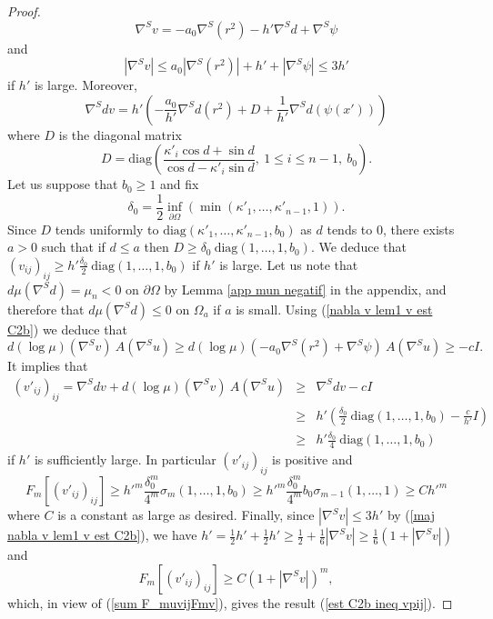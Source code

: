 \documentclass[10pt,reqno,oneside]{amsart}
\theoremstyle{definition}
\theoremstyle{remark}
\begin{document}
\begin{proof}
\begin{equation}\label{nabla v lem1 v est C2b}
\nabla^S v=-a_0\nabla^S(r^2)-h'\nabla^S d+\nabla^S\psi
\end{equation}
and 
\begin{equation}\label{maj nabla v lem1 v est C2b}
|\nabla^S v|\leq a_0|\nabla^S(r^2)|+h'+|\nabla^S\psi|\leq 3h'
\end{equation} 
if $h'$ is large. Moreover,
$$\nabla^S dv=h'\left(-\frac{a_0}{h'}\nabla^S d (r^2)+D+\frac{1}{h'}\nabla^S d(\psi(x'))\right)$$
where $D$ is the diagonal matrix
$$D=\mbox{diag}\left(\frac{\kappa'_i\cos d+\sin d}{\cos d-\kappa'_i\sin d},\ 1\leq i\leq n-1,\ b_0\right).$$
Let us suppose that $b_0\geq 1$ and fix
$$\delta_0=\frac{1}{2}\inf_{\partial\Omega}\left(\min(\kappa'_1,\ldots,\kappa'_{n-1},1)\right).$$
Since $D$ tends uniformly to $\mbox{diag}(\kappa'_1,\ldots,\kappa'_{n-1},b_0)$ as $d$ tends to 0, there exists $a>0$ such that if $d\leq a$ then $D\geq\delta_0\ \mbox{diag}(1,\ldots,1,b_0).$ We deduce that $(v_{ij})_{ij}\geq h'\frac{\delta_0}{2}\ \mbox{diag}(1,\ldots,1,b_0)$ if $h'$ is large. Let us note that $d\mu(\nabla^Sd)=\mu_n<0$ on $\partial\Omega$ by Lemma \ref{app mun negatif} in the appendix, and therefore that $d\mu(\nabla^Sd)\leq 0$ on $\Omega_a$ if $a$ is small. Using (\ref{nabla v lem1 v est C2b}) we deduce that
$$d(\log\mu)(\nabla^Sv)\ A(\nabla^Su)\geq d(\log\mu)(-a_0\nabla^S(r^2)+\nabla^S\psi)\ A(\nabla^Su)\geq-cI.$$
It implies that
\begin{eqnarray*}
(v'_{ij})_{ij}=\nabla^Sdv+d(\log\mu)(\nabla^Sv)\ A(\nabla^Su)&\geq& \nabla^Sdv-cI\\
&\geq& h'\left(\frac{\delta_0}{2}\ \mbox{diag}(1,\ldots,1,b_0)-\frac{c}{h'}I\right)\\
&\geq& h'\frac{\delta_0}{4}\ \mbox{diag}(1,\ldots,1,b_0)
\end{eqnarray*}
if $h'$ is sufficiently large. In particular $(v'_{ij})_{ij}$ is positive and 
$$F_m[(v'_{ij})_{ij}]\geq h'^m\frac{\delta_0^m}{4^m}\sigma_m(1,\ldots,1,b_0)\geq h'^m\frac{\delta_0^m}{4^m}b_0\sigma_{m-1}(1,\ldots,1)\geq C h'^m$$
where $C$ is a constant as large as desired. Finally, since $|\nabla^S v|\leq 3h'$ by (\ref{maj nabla v lem1 v est C2b}), we have $h'=\frac{1}{2}h'+\frac{1}{2}h'\geq \frac{1}{2}+\frac{1}{6}|\nabla^S v|\geq \frac{1}{6}(1+|\nabla^S v|)$ and
$$F_m[(v'_{ij})_{ij}]\geq C\left(1+|\nabla^S v|\right)^m,$$
which, in view of (\ref{sum F_muvijFmv}), gives the result (\ref{est C2b ineq vpij}).
\end{proof}
\end{document}
